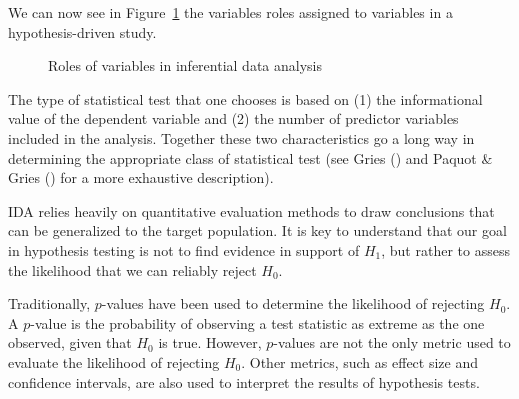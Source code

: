\documentclass[
  letterpaper,
  krantz1]{latex/krantz-mod}
\theoremstyle{definition}
\theoremstyle{definition}
\theoremstyle{remark}
\begin{document}
We can now see in Figure~\ref{fig-analysis-ida-variables} the variables
roles assigned to variables in a hypothesis-driven study.

\begin{figure}[!htb]


\caption{\label{fig-analysis-ida-variables}Roles of variables in
inferential data analysis}

\end{figure}%

The type of statistical test that one chooses is based on (1) the
informational value of the dependent variable and (2) the number of
predictor variables included in the analysis. Together these two
characteristics go a long way in determining the appropriate class of
statistical test (see Gries () and Paquot
\& Gries () for a more exhaustive
description).

IDA relies heavily on quantitative evaluation methods to draw
conclusions that can be generalized to the target population. It is key
to understand that our goal in hypothesis testing is not to find
evidence in support of \(H_1\), but rather to assess the likelihood that
we can reliably reject \(H_0\).

Traditionally, \(p\)-values have been used to determine the likelihood
of rejecting \(H_0\). A \(p\)-value is the probability of observing a
test statistic as extreme as the one observed, given that \(H_0\) is
true. However, \(p\)-values are not the only metric used to evaluate the
likelihood of rejecting \(H_0\). Other metrics, such as effect size and
confidence intervals, are also used to interpret the results of
hypothesis tests.
\end{document}
